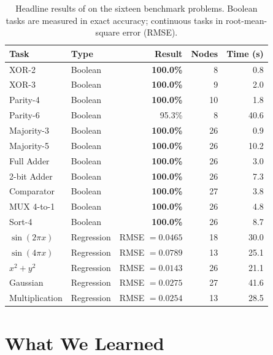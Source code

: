 \begin{table}[h]
  \centering
  \small
  \caption{Headline results of \modnet{} on the sixteen benchmark
    problems. Boolean tasks are measured in exact accuracy; continuous
    tasks in root-mean-square error (RMSE).}
  \label{tab:conclusion-headline}
  \begin{tabular}{llrrr}
    \toprule
    \textbf{Task} & \textbf{Type} & \textbf{Result} & \textbf{Nodes} & \textbf{Time (s)} \\
    \midrule
    XOR-2               & Boolean    & \textbf{100.0\%} &  8 &  0.8 \\
    XOR-3               & Boolean    & \textbf{100.0\%} &  9 &  2.0 \\
    Parity-4            & Boolean    & \textbf{100.0\%} & 10 &  1.8 \\
    Parity-6            & Boolean    & 95.3\%           &  8 & 40.6 \\
    Majority-3          & Boolean    & \textbf{100.0\%} & 26 &  0.9 \\
    Majority-5          & Boolean    & \textbf{100.0\%} & 26 & 10.2 \\
    Full Adder          & Boolean    & \textbf{100.0\%} & 26 &  3.0 \\
    2-bit Adder         & Boolean    & \textbf{100.0\%} & 26 &  7.3 \\
    Comparator          & Boolean    & \textbf{100.0\%} & 27 &  3.8 \\
    MUX 4-to-1          & Boolean    & \textbf{100.0\%} & 26 &  4.8 \\
    Sort-4              & Boolean    & \textbf{100.0\%} & 26 &  8.7 \\
    \midrule
    $\sin(2\pi x)$      & Regression & RMSE $= 0.0465$  & 18 & 30.0 \\
    $\sin(4\pi x)$      & Regression & RMSE $= 0.0789$  & 13 & 25.1 \\
    $x^2 + y^2$         & Regression & RMSE $= 0.0143$  & 26 & 21.1 \\
    Gaussian            & Regression & RMSE $= 0.0275$  & 27 & 41.6 \\
    Multiplication      & Regression & RMSE $= 0.0254$  & 13 & 28.5 \\
    \bottomrule
  \end{tabular}
\end{table}

\section{What We Learned}

